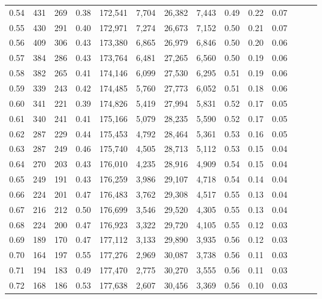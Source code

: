 \begin{tabular}{rrrrrrrrrrrrrr}
0.54 &    431 &  269 &  0.38 &  172,541 &    7,704 &  26,382 &   7,443 &  0.49 &  0.22 &      0.07 \\
0.55 &    430 &  291 &  0.40 &  172,971 &    7,274 &  26,673 &   7,152 &  0.50 &  0.21 &      0.07 \\
0.56 &    409 &  306 &  0.43 &  173,380 &    6,865 &  26,979 &   6,846 &  0.50 &  0.20 &      0.06 \\
0.57 &    384 &  286 &  0.43 &  173,764 &    6,481 &  27,265 &   6,560 &  0.50 &  0.19 &      0.06 \\
0.58 &    382 &  265 &  0.41 &  174,146 &    6,099 &  27,530 &   6,295 &  0.51 &  0.19 &      0.06 \\
0.59 &    339 &  243 &  0.42 &  174,485 &    5,760 &  27,773 &   6,052 &  0.51 &  0.18 &      0.06 \\
0.60 &    341 &  221 &  0.39 &  174,826 &    5,419 &  27,994 &   5,831 &  0.52 &  0.17 &      0.05 \\
0.61 &    340 &  241 &  0.41 &  175,166 &    5,079 &  28,235 &   5,590 &  0.52 &  0.17 &      0.05 \\
0.62 &    287 &  229 &  0.44 &  175,453 &    4,792 &  28,464 &   5,361 &  0.53 &  0.16 &      0.05 \\
0.63 &    287 &  249 &  0.46 &  175,740 &    4,505 &  28,713 &   5,112 &  0.53 &  0.15 &      0.04 \\
0.64 &    270 &  203 &  0.43 &  176,010 &    4,235 &  28,916 &   4,909 &  0.54 &  0.15 &      0.04 \\
0.65 &    249 &  191 &  0.43 &  176,259 &    3,986 &  29,107 &   4,718 &  0.54 &  0.14 &      0.04 \\
0.66 &    224 &  201 &  0.47 &  176,483 &    3,762 &  29,308 &   4,517 &  0.55 &  0.13 &      0.04 \\
0.67 &    216 &  212 &  0.50 &  176,699 &    3,546 &  29,520 &   4,305 &  0.55 &  0.13 &      0.04 \\
0.68 &    224 &  200 &  0.47 &  176,923 &    3,322 &  29,720 &   4,105 &  0.55 &  0.12 &      0.03 \\
0.69 &    189 &  170 &  0.47 &  177,112 &    3,133 &  29,890 &   3,935 &  0.56 &  0.12 &      0.03 \\
0.70 &    164 &  197 &  0.55 &  177,276 &    2,969 &  30,087 &   3,738 &  0.56 &  0.11 &      0.03 \\
0.71 &    194 &  183 &  0.49 &  177,470 &    2,775 &  30,270 &   3,555 &  0.56 &  0.11 &      0.03 \\
0.72 &    168 &  186 &  0.53 &  177,638 &    2,607 &  30,456 &   3,369 &  0.56 &  0.10 &      0.03 \\

\end{tabular}
